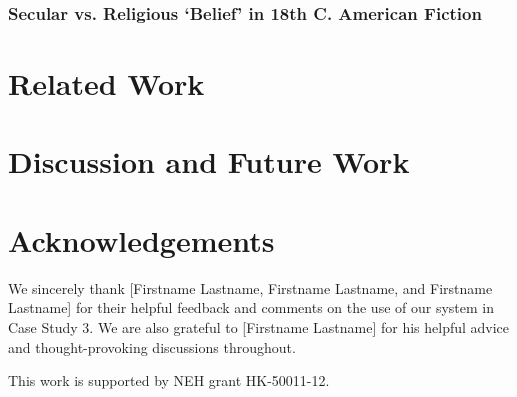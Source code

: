 \documentclass{sig-alternate}
\begin{document}
\subsubsection{Secular vs. Religious `Belief'  in 18th C. American Fiction}

\section {Related Work}

\section{Discussion and Future Work}

\section{Acknowledgements}
We sincerely thank [Firstname Lastname, Firstname Lastname, and Firstname Lastname] for their helpful feedback and comments on the use of our system in Case Study 3. We are also grateful to [Firstname Lastname] for his helpful advice and thought-provoking discussions throughout.

This work is supported by NEH grant HK-50011-12.


 
  
\end{document}
